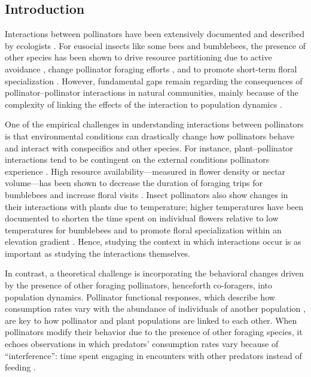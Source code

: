 \begin{refsection}
\section*{Introduction}
Interactions between pollinators have been extensively documented and described by ecologists \citep{mallinger2017managed, thomson_importance_2020}. For eusocial insects like some bees and bumblebees, the presence of other species has been shown to drive resource partitioning due to active avoidance \citep{morse_resource_1977, inouye_resource_1978}, change pollinator foraging efforts  \citep{thomson_detecting_2006}, and to promote short-term floral specialization \citep{brosi_single_2013, briggs_competitive_2016}. However, fundamental gaps remain regarding the consequences of pollinator--pollinator interactions in natural communities, mainly because of the complexity of linking the effects of the interaction to population dynamics \citep{thomson_importance_2020}.


One of the empirical challenges in understanding interactions between pollinators is that environmental conditions can drastically change how pollinators behave and interact with conspecifics and other species. For instance, plant--pollinator interactions tend to be contingent on the external conditions pollinators experience \citep{heinrich_resource_1976,cnaani_flower_2006}. High resource availability---measured in flower density or nectar volume---has been shown to decrease the duration of foraging trips for bumblebees \citep{westphal_foraging_2006} and increase floral visits \citep{thomson_response_1987, thomson_effects_1988}. Insect pollinators also show changes in their interactions with plants due to temperature; higher temperatures have been documented to shorten the time spent on individual flowers relative to low temperatures for bumblebees \citep{heinrich_energetics_1972} and to promote floral specialization within an elevation gradient \citep{classen2020specialization}. Hence, studying the context in which interactions occur is as important as studying the interactions themselves.


In contrast, a theoretical challenge is incorporating the behavioral changes driven by the presence of other foraging pollinators, henceforth co-foragers, into population dynamics. Pollinator functional responses, which describe how consumption rates vary with the abundance of individuals of another population \citep{holland_population_2001}, are key to how pollinator and plant populations are linked to each other. When pollinators modify their behavior due to the presence of other foraging species, it echoes observations in which predators' consumption rates vary because of ``interference'': time spent engaging in encounters with other predators instead of feeding \citep{beddington_mutual_1975,deangelis_emergence_2006,skalski_functional_2001}.


\end{refsection}
